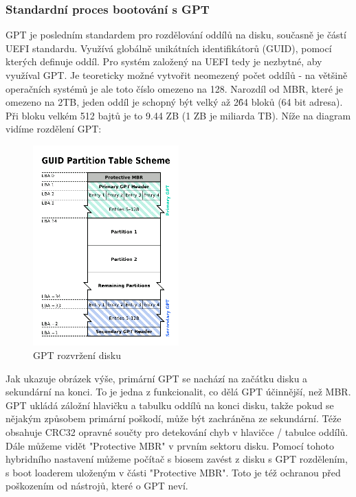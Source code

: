 \documentclass[thesis=B,czech]{FITthesis}[2012/06/26]
\begin{document}
\subsubsection{Standardní proces bootování s GPT}

GPT je posledním standardem pro rozdělování oddílů na disku, současně je částí UEFI standardu. Využívá globálně unikátních identifikátorů (GUID), pomocí kterých definuje oddíl. Pro systém založený na UEFI tedy je nezbytné, aby využíval GPT. Je teoreticky možné vytvořit neomezený počet oddílů - na většině operačních systémů je ale toto číslo omezeno na 128. Narozdíl od MBR, které je omezeno na 2TB, jeden oddíl je schopný být velký až 2\^64 bloků (64 bit adresa). Při bloku velkém 512 bajtů je to 9.44 ZB (1 ZB je miliarda TB). Níže na diagram vidíme rozdělení GPT:



\begin{figure}[h]\centering
\includegraphics[width=0.5\textwidth]{files/gpt-partition-scheme.png}
	\caption{GPT rozvržení disku}\label{fig:float}
\end{figure}

Jak ukazuje obrázek výše, primární GPT se nachází na začátku disku a sekundární na konci. To je jedna z funkcionalit, co dělá GPT účinnější, než MBR. GPT ukládá záložní hlavičku a tabulku oddílů na konci disku, takže pokud se nějakým způsobem primární poškodí, může být zachráněna ze sekundární. Téže obsahuje CRC32 opravné součty pro detekování chyb v hlavičce / tabulce oddílů. Dále můžeme vidět "Protective MBR" v prvním sektoru disku. Pomocí tohoto hybridního nastavení můžeme počítač s biosem zavést z disku s GPT rozdělením, s boot loaderem uloženým v části "Protective MBR". Toto je též ochranou před poškozením od nástrojů, které o GPT neví.
\end{document}
